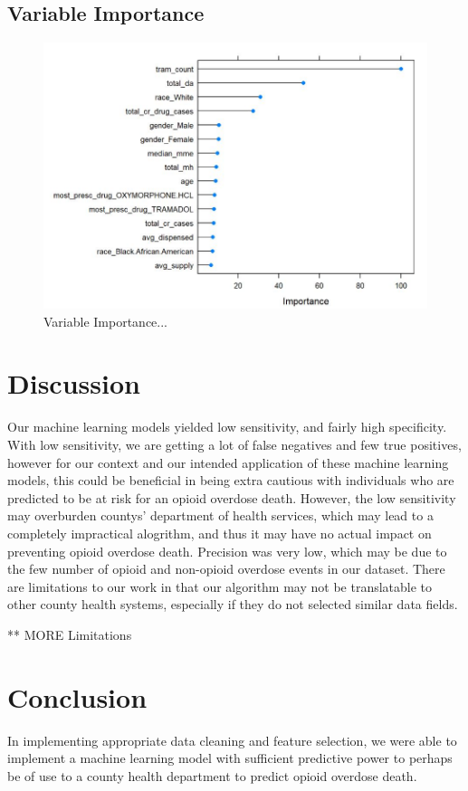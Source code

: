 \documentclass[twoside,10.5pt]{article}
\begin{document}
\subsection{Variable Importance}

\begin{figure}[htp]
\centering
\includegraphics[width=12cm]{images/variable_importance.JPG}
\caption{Variable Importance... }
\label{fig:var_importance}
\end{figure}



\section{Discussion}
Our machine learning models yielded low sensitivity, and fairly high specificity. With low sensitivity, we are getting a lot of false negatives and few true positives, however for our context and our intended application of these machine learning models, this could be beneficial in being extra cautious with individuals who are predicted to be at risk for an opioid overdose death. However, the low sensitivity may overburden countys' department of health services, which may lead to a completely impractical alogrithm, and thus it may have no actual impact on preventing opioid overdose death. Precision was very low, which may be due to the few number of opioid and non-opioid overdose events in our dataset. 
There are limitations to our work in that our algorithm may not be translatable to other county health systems, especially if they do not selected similar data fields.


** MORE Limitations 

\section{Conclusion}
In implementing appropriate data cleaning and feature selection, we were able to implement a machine learning model with sufficient predictive power to perhaps be of use to a county health department to predict opioid overdose death. 
\end{document}
